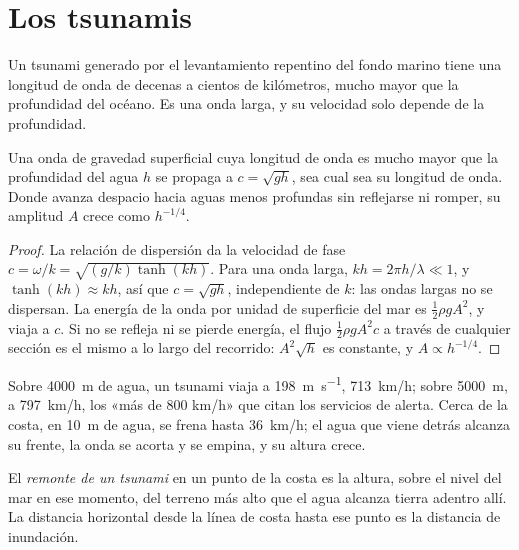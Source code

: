 \section{Los tsunamis}\label{sec:b2:geological-hazards:tsunamis}

Un tsunami generado por el levantamiento repentino del fondo marino tiene una longitud de onda de decenas a cientos de
kilómetros, mucho mayor que la profundidad del océano. Es una onda larga, y su velocidad solo depende
de la profundidad.

\begin{proposition}\label{prop:b2:geological-hazards:long-waves}
Una onda de gravedad superficial cuya longitud de onda es mucho mayor que la profundidad del agua $h$ se propaga a
$c = \sqrt{gh}$, sea cual sea su longitud de onda. Donde avanza despacio hacia aguas menos profundas sin
reflejarse ni romper, su amplitud $A$ crece como $h^{-1/4}$.
\end{proposition}

\begin{proof}
La relación de dispersión da la velocidad de fase $c = \omega/k = \sqrt{(g/k)\tanh(kh)}$. Para una onda
larga, $kh = 2\pi h/\lambda \ll 1$, y $\tanh(kh) \approx kh$, así que $c = \sqrt{gh}$, independiente de
$k$: las ondas largas no se dispersan. La energía de la onda por unidad de superficie del mar es $\frac12
\rho g A^2$, y viaja a $c$. Si no se refleja ni se pierde energía, el flujo $\frac12\rho g A^2
c$ a través de cualquier sección es el mismo a lo largo del recorrido: $A^2 \sqrt{h}$ es constante, y $A \propto
h^{-1/4}$.
\end{proof}

Sobre \qty{4000}{m} de agua, un tsunami viaja a \qty{198}{m.s^{-1}}, \qty{713}{km/h}; sobre
\qty{5000}{m}, a \qty{797}{km/h}, los «más de 800 km/h» que citan los servicios de alerta. Cerca de la
costa, en \qty{10}{m} de agua, se frena hasta \qty{36}{km/h}; el agua que viene detrás alcanza su frente,
la onda se acorta y se empina, y su altura crece.

\begin{definition}\label{def:b2:geological-hazards:tsunami}
El \emph{remonte de un tsunami} en un punto de la costa es la altura, sobre el
nivel del mar en ese momento, del terreno más alto que el agua alcanza tierra adentro allí. La distancia
horizontal desde la línea de costa hasta ese punto es la distancia de inundación.
\end{definition}

